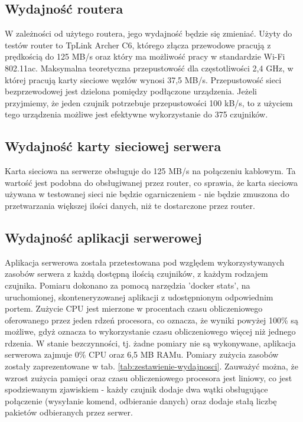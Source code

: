 \documentclass[12pt,oneside,a4paper]{book}
\theoremstyle{break}
\begin{document}
\subsection{Wydajność routera}
W zależności od użytego routera, jego wydajność będzie się
zmieniać. Użyty do testów router to TpLink Archer C6,
którego złącza przewodowe pracują z prędkością do 125 MB/s
oraz który ma możliwość pracy w standardzie 
Wi-Fi 802.11ac. Maksymalna teoretyczna przepustowość dla
częstotliwości 2,4 GHz, w której pracują karty sieciowe
węzłów wynosi 37,5 MB/s. Przepustowość sieci 
bezprzewodowej jest dzielona pomiędzy podłączone urządzenia. 
Jeżeli przyjmiemy, że jeden czujnik potrzebuje 
przepustowości 100 kB/s, to z użyciem tego urządzenia możliwe
jest efektywne wykorzystanie do 375 czujników.

\subsection{Wydajność karty sieciowej serwera}
Karta sieciowa na serwerze obsługuje do 125 MB/s na połączeniu
kablowym. Ta wartość jest podobna do obsługiwanej przez 
router, co sprawia, że karta sieciowa używana w testowanej sieci
nie będzie ogarniczeniem - nie będzie zmuszona do przetwarzania 
większej ilości danych, niż te dostarczone przez router.

\subsection{Wydajność aplikacji serwerowej}  \label{app-efficiency-subsection}
Aplikacja serwerowa została przetestowana pod względem wykorzystywanych
zasobów serwera z każdą dostępną ilością czujników, z każdym rodzajem
czujnika. Pomiaru dokonano za pomocą narzędzia 'docker stats', na
uruchomionej, skonteneryzowanej aplikacji z udostępnionym odpowiednim
portem. Zużycie CPU jest mierzone w procentach czasu obliczeniowego
oferowanego przez jeden rdzeń procesora, co oznacza, że wyniki 
powyżej 100\% są możliwe, gdyż oznacza to wykorzystanie 
czasu obliczeniowego więcej niż jednego rdzenia. W stanie bezczynności, tj.
żadne pomiary nie są wykonywane, aplikacja serwerowa zajmuje
0\% CPU oraz 6,5 MB RAMu.
Pomiary zużycia zasobów zostały zaprezentowane w tab. \ref*{tab:zestawienie-wydajnosci}.
Zauważyć można, że wzrost zużycia pamięci oraz czasu obliczeniowego
procesora jest liniowy, co jest spodziewanym zjawiskiem - każdy czujnik 
dodaje dwa wątki obsługujące połączenie (wysyłanie komend, odbieranie danych)
oraz dodaje stałą liczbę pakietów odbieranych przez serwer.
\end{document}
